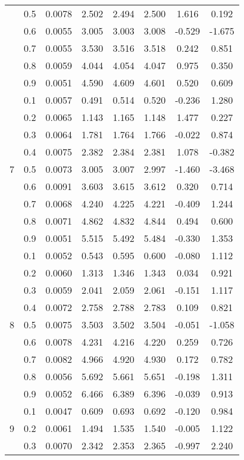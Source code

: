 \documentclass[11pt,a4paper]{report}
\begin{document}
\begin{longtable}{ | c | c || c | c | c | c | c | c | }
 & 0.5 & 0.0078 & 2.502 & 2.494 & 2.500 & 1.616 & 0.192 \\
 & 0.6 & 0.0055 & 3.005 & 3.003 & 3.008 & -0.529 & -1.675 \\
 & 0.7 & 0.0055 & 3.530 & 3.516 & 3.518 & 0.242 & 0.851 \\
 & 0.8 & 0.0059 & 4.044 & 4.054 & 4.047 & 0.975 & 0.350 \\
 & 0.9 & 0.0051 & 4.590 & 4.609 & 4.601 & 0.520 & 0.609 \\
 \hline
\multirow{9}{*}{7} & 0.1 & 0.0057 & 0.491 & 0.514 & 0.520 & -0.236 & 1.280 \\
 & 0.2 & 0.0065 & 1.143 & 1.165 & 1.148 & 1.477 & 0.227 \\
 & 0.3 & 0.0064 & 1.781 & 1.764 & 1.766 & -0.022 & 0.874 \\
 & 0.4 & 0.0075 & 2.382 & 2.384 & 2.381 & 1.078 & -0.382 \\
 & 0.5 & 0.0073 & 3.005 & 3.007 & 2.997 & -1.460 & -3.468 \\
 & 0.6 & 0.0091 & 3.603 & 3.615 & 3.612 & 0.320 & 0.714 \\
 & 0.7 & 0.0068 & 4.240 & 4.225 & 4.221 & -0.409 & 1.244 \\
 & 0.8 & 0.0071 & 4.862 & 4.832 & 4.844 & 0.494 & 0.600 \\
 & 0.9 & 0.0051 & 5.515 & 5.492 & 5.484 & -0.330 & 1.353 \\
 \hline
\multirow{9}{*}{8} & 0.1 & 0.0052 & 0.543 & 0.595 & 0.600 & -0.080 & 1.112 \\
 & 0.2 & 0.0060 & 1.313 & 1.346 & 1.343 & 0.034 & 0.921 \\
 & 0.3 & 0.0059 & 2.041 & 2.059 & 2.061 & -0.151 & 1.117 \\
 & 0.4 & 0.0072 & 2.758 & 2.788 & 2.783 & 0.109 & 0.821 \\
 & 0.5 & 0.0075 & 3.503 & 3.502 & 3.504 & -0.051 & -1.058 \\
 & 0.6 & 0.0078 & 4.231 & 4.216 & 4.220 & 0.259 & 0.726 \\
 & 0.7 & 0.0082 & 4.966 & 4.920 & 4.930 & 0.172 & 0.782 \\
 & 0.8 & 0.0056 & 5.692 & 5.661 & 5.651 & -0.198 & 1.311 \\
 & 0.9 & 0.0052 & 6.466 & 6.389 & 6.396 & -0.039 & 0.913 \\
 \hline
\multirow{9}{*}{9} & 0.1 & 0.0047 & 0.609 & 0.693 & 0.692 & -0.120 & 0.984 \\
 & 0.2 & 0.0061 & 1.494 & 1.535 & 1.540 & -0.005 & 1.122 \\
 & 0.3 & 0.0070 & 2.342 & 2.353 & 2.365 & -0.997 & 2.240 \\

\end{longtable}
\end{document}
